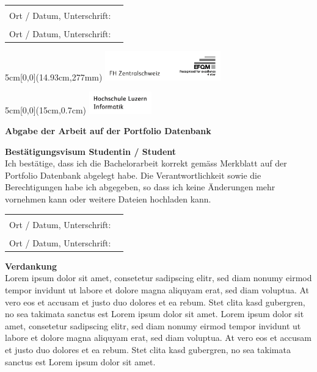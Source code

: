 \noindent
\begin{tabularx}{\textwidth}{@{}lX}
	&\\
	Ort / Datum, Unterschrift: &  \\
	\cline{2-2}
	&\\[0.5cm]
	Ort / Datum, Unterschrift: &  \\
	\cline{2-2}
\end{tabularx}

\begin{textblock*}{5cm}[0,0](14.93cm,277mm)
	\includegraphics[keepaspectratio,width=5cm]{img/FHZ_Logo}
\end{textblock*}

\newpage

\begin{textblock*}{5cm}[0,0](15cm,0.7cm)
	\includegraphics[keepaspectratio,width=2.7cm]{img/HSLU_Logo_Header}
\end{textblock*}

\noindent
\textbf{Abgabe der Arbeit auf der Portfolio Datenbank}

\vspace{0.5em}

\noindent
\textbf{Bestätigungsvisum Studentin / Student}
\\
\noindent
Ich bestätige, dass ich die Bachelorarbeit korrekt gemäss Merkblatt auf der Portfolio Datenbank abgelegt habe. Die Verantwortlichkeit sowie die Berechtigungen habe ich abgegeben, so dass ich keine Änderungen mehr vornehmen kann oder weitere Dateien hochladen kann.

\vspace{0.7em}

\noindent
\begin{tabularx}{\textwidth}{@{}lX}
	&\\
	Ort / Datum, Unterschrift: &  \\
	\cline{2-2}
	&\\[0.5cm]
	Ort / Datum, Unterschrift: &  \\
	\cline{2-2}
\end{tabularx}

\vspace{0.8cm}
\noindent
\textbf{Verdankung}
\\
Lorem ipsum dolor sit amet, consetetur sadipscing elitr, sed diam nonumy eirmod tempor invidunt ut labore et dolore magna aliquyam erat, sed diam voluptua. At vero eos et accusam et justo duo dolores et ea rebum. Stet clita kasd gubergren, no sea takimata sanctus est Lorem ipsum dolor sit amet. Lorem ipsum dolor sit amet, consetetur sadipscing elitr, sed diam nonumy eirmod tempor invidunt ut labore et dolore magna aliquyam erat, sed diam voluptua. At vero eos et accusam et justo duo dolores et ea rebum. Stet clita kasd gubergren, no sea takimata sanctus est Lorem ipsum dolor sit amet.


